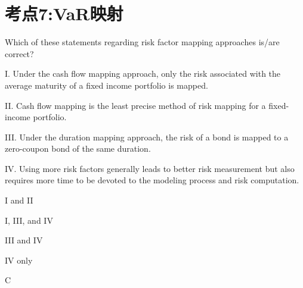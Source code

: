 \documentclass{article}
\newcounter{question} %
\begin{document}
\newpage



\section{考点7:VaR映射}
\setcounter{question}{0}


\begin{question}
    Which of these statements regarding risk factor mapping approaches is/are correct? 
    
    I. Under the cash flow mapping approach, only the risk associated with the average maturity of a fixed income portfolio is mapped. 
    
    II. Cash flow mapping is the least precise method of risk mapping for a fixed-income portfolio. 
    
    III. Under the duration mapping approach, the risk of a bond is mapped to a zero-coupon bond of the same duration. 
    
    IV. Using more risk factors generally leads to better risk measurement but also requires more time to be devoted to the modeling process and risk computation.
\end{question}

\begin{choices}
    \item I and II
    \item I, III, and IV
    \item III and IV
    \item IV only
\end{choices}

\begin{correctanswer}
    C
\end{correctanswer}
\end{document}
